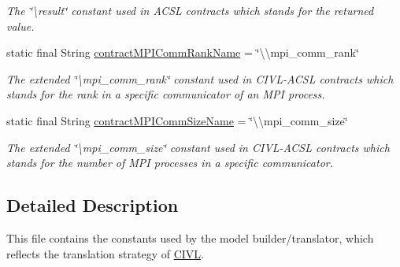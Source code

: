 \begin{DoxyCompactItemize}
\begin{DoxyCompactList}\small\item\em The \char`\"{}\textbackslash{}result\char`\"{} constant used in A\+C\+S\+L contracts which stands for the returned value. \end{DoxyCompactList}\item 
\hypertarget{classedu_1_1udel_1_1cis_1_1vsl_1_1civl_1_1model_1_1IF_1_1ModelConfiguration_a44c95197834cc1409108138998de8286}{}static final String \hyperlink{classedu_1_1udel_1_1cis_1_1vsl_1_1civl_1_1model_1_1IF_1_1ModelConfiguration_a44c95197834cc1409108138998de8286}{contract\+M\+P\+I\+Comm\+Rank\+Name} = \char`\"{}\textbackslash{}\textbackslash{}mpi\+\_\+comm\+\_\+rank\char`\"{}\label{classedu_1_1udel_1_1cis_1_1vsl_1_1civl_1_1model_1_1IF_1_1ModelConfiguration_a44c95197834cc1409108138998de8286}

\begin{DoxyCompactList}\small\item\em The extended \char`\"{}\textbackslash{}mpi\+\_\+comm\+\_\+rank\char`\"{} constant used in C\+I\+V\+L-\/\+A\+C\+S\+L contracts which stands for the rank in a specific communicator of an M\+P\+I process. \end{DoxyCompactList}\item 
\hypertarget{classedu_1_1udel_1_1cis_1_1vsl_1_1civl_1_1model_1_1IF_1_1ModelConfiguration_aa2667ca3921784bb4ffe82a12c933ffd}{}static final String \hyperlink{classedu_1_1udel_1_1cis_1_1vsl_1_1civl_1_1model_1_1IF_1_1ModelConfiguration_aa2667ca3921784bb4ffe82a12c933ffd}{contract\+M\+P\+I\+Comm\+Size\+Name} = \char`\"{}\textbackslash{}\textbackslash{}mpi\+\_\+comm\+\_\+size\char`\"{}\label{classedu_1_1udel_1_1cis_1_1vsl_1_1civl_1_1model_1_1IF_1_1ModelConfiguration_aa2667ca3921784bb4ffe82a12c933ffd}

\begin{DoxyCompactList}\small\item\em The extended \char`\"{}\textbackslash{}mpi\+\_\+comm\+\_\+size\char`\"{} constant used in C\+I\+V\+L-\/\+A\+C\+S\+L contracts which stands for the number of M\+P\+I processes in a specific communicator. \end{DoxyCompactList}\end{DoxyCompactItemize}


\subsection{Detailed Description}
This file contains the constants used by the model builder/translator, which reflects the translation strategy of \hyperlink{classedu_1_1udel_1_1cis_1_1vsl_1_1civl_1_1CIVL}{C\+I\+V\+L}. 

